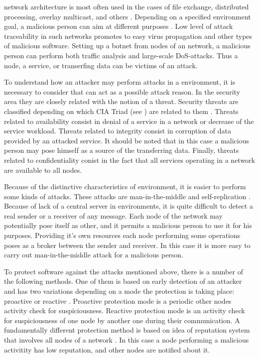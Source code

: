 %
 network architecture is most often used in the cases of file exchange, distributed processing, overlay multicast, and others . 
%
Depending on a specified  environment goal, a malicious person can aim at different purposes  . 
%
Low level of attack traceability in such networks promotes to easy virus propagation and other types of malicious software. 
%
Setting up a botnet from nodes of an  network, a malicious person can perform both traffic analysis and large-scale DoS-attacks. 
%
Thus a node, a service, or transerfing data can be victims of an attack. 

%
To understand how an attacker may perform attacks in a  environment, it is necessary to consider that can act as a possible attack reason. 
%
In the security area they are closely related with the notion of a threat. 
%
Security threats are classified depending on which CIA Triad (see ) are related to them   . 
%
Threats related to availability consist in denial of a service in a network or decrease of the service workload. 
%
Threats related to integrity consist in corruption of data provided by an attacked service. 
%
It should be noted that in this case a malicious person may pose himself as a source of the transferring data. 
%
Finally, threats related to confidentiality conist in the fact that all services operating in a network are available to all nodes. 

%
Because of the distinctive characteristics of  environment, it is easier to perform some kinds of attacks. 
%
These attacks are man-in-the-middle and self-replication . 
%
Because of lack of a central server in  environments, it is quite difficult to detect a real sender or a receiver of any message. 
%
Each node of the network may potentially pose itself as other, and it permits a malicious person to use it for his purposes. 
%
Providing it's own resources each node performing some operations poses as a broker between the sender and receiver. 
%
In this case it is more easy to carry out man-in-the-middle attack for a malicious person. 

%
To protect software against the attacks mentioned above, there is a number of the following methods. 
%
One of them is based on early detection of an attacker and has two variations depending on a mode the protection is taking place: proactive or reactive . 
%
Proactive protection mode is a periodic other nodes activity check for suspiciousness. 
%
Reactive protection mode is an activity check for suspiciousness of one node by another one during their communication. 
%
A fundamentally different protection method is based on idea of reputation system that involves all nodes of a  network  . 
%
In this case a node performing a malicious activitity has low reputation, and other nodes are notified about it. 


